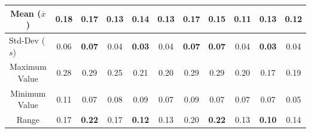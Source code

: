\begin{itemize}
\begin{table}[htbp]
{\begin{tabular}{@{}ccccccccccc@{}}
      \multicolumn{1}{c|}{Mean ($\overline{x}$)}                                            & \cellcolor[HTML]{FD6864}\textbf{0.18} & \cellcolor[HTML]{FFFFFF}0.17           & \cellcolor[HTML]{32CB00}\textbf{0.13} & \cellcolor[HTML]{FFFFFF}0.14           & \multicolumn{1}{c|}{\cellcolor[HTML]{32CB00}\textbf{0.13}} & \cellcolor[HTML]{FD6864}\textbf{0.17} & \cellcolor[HTML]{FFFFFF}0.15           & \cellcolor[HTML]{32CB00}\textbf{0.11} & \cellcolor[HTML]{FFFFFF}0.13           & \multicolumn{1}{c|}{\cellcolor[HTML]{FFFFFF}0.12}  \\ \midrule
      \multicolumn{1}{l|}{Std-Dev ($s$)}                                            & \cellcolor[HTML]{FFFFFF}0.06          & \cellcolor[HTML]{FD6864}\textbf{0.07}  & \cellcolor[HTML]{FFFFFF}0.04          & \cellcolor[HTML]{32CB00}\textbf{0.03}  & \multicolumn{1}{c|}{\cellcolor[HTML]{FFFFFF}0.04}          & \cellcolor[HTML]{FD6864}\textbf{0.07} & \cellcolor[HTML]{FD6864}\textbf{0.07}  & \cellcolor[HTML]{FFFFFF}0.04          & \cellcolor[HTML]{32CB00}\textbf{0.03}  & \multicolumn{1}{c|}{\cellcolor[HTML]{FFFFFF}0.04}  \\ \midrule
      \multicolumn{1}{c|}{Maximum Value}                                                 & \cellcolor[HTML]{FFFFFF}0.28          & \cellcolor[HTML]{FFFFFF}0.29           & \cellcolor[HTML]{FFFFFF}0.25          & \cellcolor[HTML]{FFFFFF}0.21           & \multicolumn{1}{c|}{\cellcolor[HTML]{FFFFFF}0.20}          & \cellcolor[HTML]{FFFFFF}0.29          & \cellcolor[HTML]{FFFFFF}0.29           & \cellcolor[HTML]{FFFFFF}0.20          & \cellcolor[HTML]{FFFFFF}0.17           & \multicolumn{1}{c|}{\cellcolor[HTML]{FFFFFF}0.19}  \\ \midrule
      \multicolumn{1}{c|}{Minimum Value}                                                 & \cellcolor[HTML]{FFFFFF}0.11          & \cellcolor[HTML]{FFFFFF}0.07           & \cellcolor[HTML]{FFFFFF}0.08          & \cellcolor[HTML]{FFFFFF}0.09           & \multicolumn{1}{c|}{\cellcolor[HTML]{FFFFFF}0.07}          & \cellcolor[HTML]{FFFFFF}0.09          & \cellcolor[HTML]{FFFFFF}0.07           & \cellcolor[HTML]{FFFFFF}0.07          & \cellcolor[HTML]{FFFFFF}0.07           & \multicolumn{1}{c|}{\cellcolor[HTML]{FFFFFF}0.05}  \\ \midrule
      \multicolumn{1}{c|}{Range}                                                         & \cellcolor[HTML]{FFFFFF}0.17          & \cellcolor[HTML]{FD6864}\textbf{0.22}  & \cellcolor[HTML]{FFFFFF}0.17          & \cellcolor[HTML]{32CB00}\textbf{0.12}  & \multicolumn{1}{c|}{\cellcolor[HTML]{FFFFFF}0.13}          & \cellcolor[HTML]{FFFFFF}0.20          & \cellcolor[HTML]{FD6864}\textbf{0.22}  & \cellcolor[HTML]{FFFFFF}0.13          & \cellcolor[HTML]{32CB00}\textbf{0.10}  & \multicolumn{1}{c|}{\cellcolor[HTML]{FFFFFF}0.14}  \\ \midrule

\end{tabular}}
\end{table}
\end{itemize}
